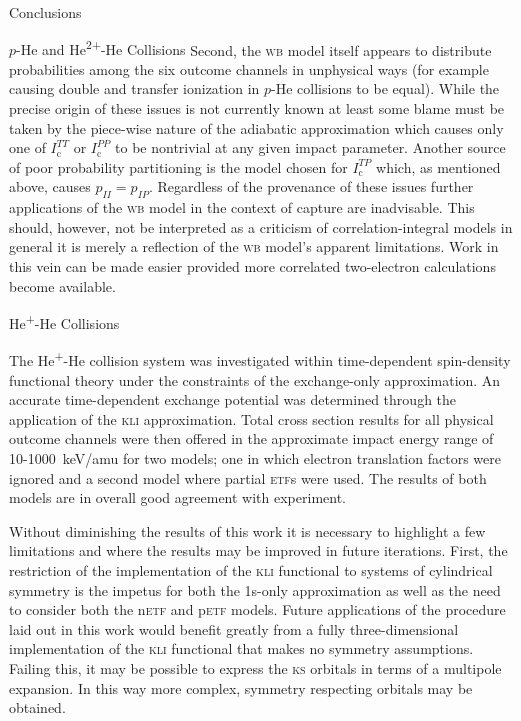 \documentclass[a5paper, 9 pt]{extreport}
\begin{document}
\begin{chapter}{Conclusions \label{chap:con}}
\begin{section}{\texorpdfstring{$p$}{p}-He and \texorpdfstring{He\textsuperscript{2+}}{He2+}-He
                   Collisions \label{sec:con-phe2p-he}}
      Second, the \textsc{wb} model itself appears to distribute probabilities among the six outcome
      channels in unphysical ways (for example causing double and transfer ionization in $p$-He
      collisions to be equal). While the precise origin of these issues is not currently known at least
      some blame must be taken by the piece-wise nature of the adiabatic approximation which causes only
      one of $I^{TT}_\mathrm{c}$ or $I^{PP}_\mathrm{c}$ to be nontrivial at any given impact parameter.
      Another source of poor probability partitioning is the model chosen for $I^{TP}_\mathrm{c}$ which,
      as mentioned above, causes $p_{II} = p_{IP}$. Regardless of the provenance of these issues further
      applications of the \textsc{wb} model in the context of capture are inadvisable. This should,
      however, not be interpreted as a criticism of correlation-integral models in general it is merely
      a reflection of the \textsc{wb} model's apparent limitations. Work in this vein can be made easier
      provided more correlated two-electron calculations become available.

   \end{section}

   \begin{section}{\texorpdfstring{He\textsuperscript{+}}{He+}-He Collisions \label{sec:con-hephe}}

      The He\textsuperscript{+}-He collision system was investigated within  time-dependent spin-density
      functional theory under the constraints of the exchange-only approximation. An accurate
      time-dependent exchange potential was determined through the application of the \textsc{kli}
      approximation. Total cross section results for all physical outcome channels were then offered in
      the approximate impact energy range of 10-1000~keV/amu for two models; one in which electron
      translation factors were ignored and a second model where partial \textsc{etf}s
      were used. The results of both models are in overall good agreement with experiment.

      Without diminishing the results of this work it is necessary to highlight a few limitations and
      where the results may be improved in future iterations. First, the restriction of the
      implementation of the \textsc{kli} functional to systems of cylindrical symmetry is the impetus
      for both the 1s-only approximation as well as the need to consider both the n\textsc{etf} and
      p\textsc{etf} models. Future applications of the procedure laid out in this work would benefit
      greatly from a fully three-dimensional implementation of the \textsc{kli} functional that makes no
      symmetry assumptions. Failing this, it may be possible to express the \textsc{ks} orbitals in
      terms of a multipole expansion. In this way more complex, symmetry respecting orbitals may be
      obtained.


\end{section}
\end{chapter}
\end{document}
